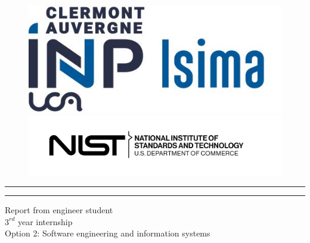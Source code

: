 
\begin{titlepage}
  \rmfamily{}

  \hspace{\fill}
  \begin{figure}[!htb]
     \begin{minipage}{0.50\textwidth}
       \centering
       \includegraphics[width=0.8\linewidth]{logos/isima.jpeg}
     \end{minipage}\hfill
     \begin{minipage}{0.50\textwidth}
       \centering
       \includegraphics[width=1.2\linewidth]{logos/nist-logo.png}%
     \end{minipage}
     \label{titelfig:logos}
  \end{figure}
  \vspace*{1cm}

  \begin{center}
    \begin{Large}
    \par\noindent\rule{\textwidth}{0.5pt}
    \Huge
    \textbf{\paperTitle}
    \par\noindent\rule{\textwidth}{0.5pt}
    \vspace{0.2cm}
    \LARGE
    Report from engineer student\\
    $3^{rd}$ year internship\\
    Option 2: Software engineering and information systems
    \end{Large}


\end{center}
\end{titlepage}
